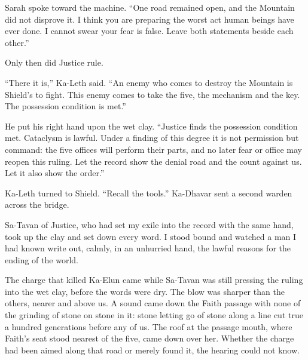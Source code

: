 Sarah spoke toward the machine. ``One road remained open, and the Mountain did not disprove it. I think you are preparing the worst act human beings have ever done. I cannot swear your fear is false. Leave both statements beside each other.''\par

Only then did Justice rule.\par

``There it is,'' Ka-Leth said. ``An enemy who comes to destroy the Mountain is Shield's to fight. This enemy comes to take the five, the mechanism and the key. The possession condition is met.''\par

He put his right hand upon the wet clay. ``Justice finds the possession condition met. Cataclysm is lawful. Under a finding of this degree it is not permission but command: the five offices will perform their parts, and no later fear or office may reopen this ruling. Let the record show the denial road and the count against us. Let it also show the order.''\par

Ka-Leth turned to Shield. ``Recall the tools.'' Ka-Dhavar sent a second warden across the bridge.\par

Sa-Tavan of Justice, who had set my exile into the record with the same hand, took up the clay and set down every word. I stood bound and watched a man I had known write out, calmly, in an unhurried hand, the lawful reasons for the ending of the world.\par

\ornament

The charge that killed Ka-Elun came while Sa-Tavan was still pressing the ruling into the wet clay, before the words were dry. The blow was sharper than the others, nearer and above us. A sound came down the Faith passage with none of the grinding of stone on stone in it: stone letting go of stone along a line cut true a hundred generations before any of us. The roof at the passage mouth, where Faith's seat stood nearest of the five, came down over her. Whether the charge had been aimed along that road or merely found it, the hearing could not know.\par

